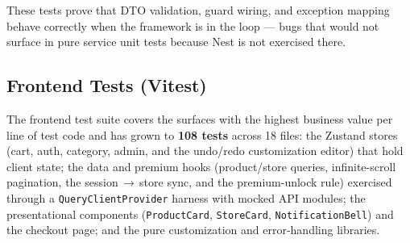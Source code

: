 \documentclass[12pt, a4paper, oneside]{report}
\begin{document}
These tests prove that DTO validation, guard wiring, and exception
mapping behave correctly when the framework is in the loop --- bugs
that would not surface in pure service unit tests because Nest is not
exercised there.

\subsection{Frontend Tests (Vitest)}

The frontend test suite covers the surfaces with the highest business
value per line of test code and has grown to \textbf{108 tests} across
18 files: the Zustand stores (cart, auth, category, admin, and the
undo/redo customization editor) that hold client state; the data and
premium hooks (product/store queries, infinite-scroll pagination, the
session\,$\rightarrow$\,store sync, and the premium-unlock rule)
exercised through a \texttt{QueryClientProvider} harness with mocked
API modules; the presentational components (\texttt{ProductCard},
\texttt{StoreCard}, \texttt{NotificationBell}) and the checkout page;
and the pure customization and error-handling libraries.
\end{document}
